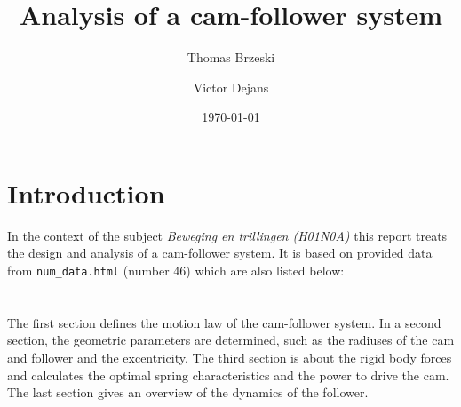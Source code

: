 \documentclass[a4paper]{article}
\date{\today}
\author{Thomas Brzeski \and  Victor Dejans}
\title{Analysis of a cam-follower system}
\begin{document}
	

\maketitle

\section*{Introduction}

In the context of the subject \textit{Beweging en trillingen (H01N0A)} this report treats the design and analysis of a cam-follower system. It is based on provided data from \texttt{num\_data.html} (number 46) which are also listed below:
\\

\\
\\



The first section defines the motion law of the cam-follower system. In a second section, the geometric parameters are determined, such as the radiuses of the cam and follower and the excentricity. The third section is about the rigid body forces and calculates the optimal spring characteristics and the power to drive the cam. The last section gives an overview of the dynamics of the follower.
\end{document}
